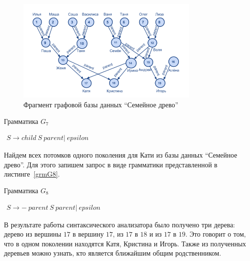 \begin{figure}
 \centering
 \includegraphics[width=0.8\textwidth]{Smolina/pics/GraphFamily.png}
 \caption{Фрагмент графовой базы данных ``Семейное древо''}
 \label{GraphFamily}
\end{figure}

\begin{listing}
\caption{Грамматика $G_7$}
\label{grmG7}
\centering
$\begin{array}{rl}
S \rightarrow child \ S \ parent| \ epsilon
\end{array}$
 \end{listing}

Найдем всех потомков одного поколения для Кати из базы данных ``Семейное древо''. Для этого запишем запрос в виде грамматики
представленной в листинге~\ref{grmG8}.

\begin{listing}
\caption{Грамматика $G_8$}
\label{grmG8}
\centering
$\begin{array}{rl}
S \rightarrow - \ parent \ S \ parent| \ epsilon
\end{array}$
 \end{listing}

В результате работы синтаксического анализатора было получено три дерева: дерево из вершины $17$ в вершину $17$, из $17$ в $18$ и из $17$ в $19$. Это говорит о том, что в одном поколении находятся Катя, Кристина и Игорь. Также из полученных деревьев можно узнать, кто является ближайшим общим родственником.
